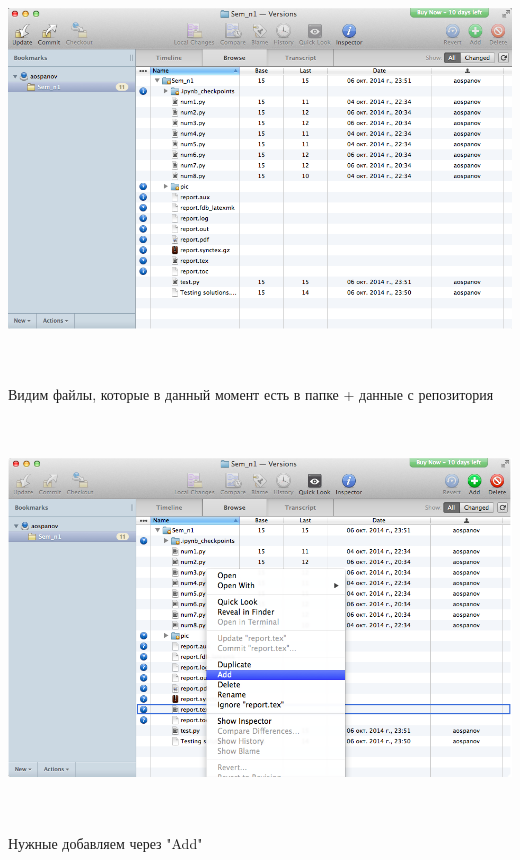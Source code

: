 \documentclass[12pt, a4paper]{article}
\begin{document}
			\begin{center}
				\includegraphics[height=10.5cm]{svn/svn_4.png}

				Видим файлы, которые в данный момент есть в папке + данные с репозитория \\
			\end{center}

			\begin{center}
				\includegraphics[height=10.5cm]{svn/svn_5.png}

				Нужные добавляем через "Add" \\
				~\newline
			\end{center}
\end{document}
